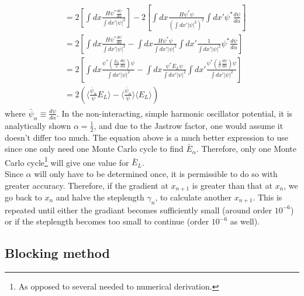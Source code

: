 \documentclass[english, a4paper]{article}
\begin{document}
\begin{align}
\begin{split}
&= 2\left[ \int dx\frac{H\psi^*\frac{d\psi}{d\alpha}}{\int dx'|\psi|^2} \right] - 2\left[ \int dx \frac{H\psi^*\psi}{\left(\int dx'|\psi|^2\right)^2}\int dx' \psi^*\frac{d\psi}{d\alpha} \right]\\
&= 2\left[ \int dx\frac{H\psi^*\frac{d\psi}{d\alpha}}{\int dx'|\psi|^2} - \int dx \frac{H\psi^*\psi}{\int dx'|\psi|^2}\int dx' \frac{1}{\int dx'|\psi|^2}\psi^*\frac{d\psi}{d\alpha} \right]\\
&= 2\left[ \int dx\frac{\psi^*\left(\frac{E_L}{\psi}\frac{d\psi}{d\alpha}\right) \psi}{\int dx'|\psi|^2} - \int dx \frac{\psi^* E_L\psi}{\int dx'|\psi|^2}\int dx' \frac{\psi^*\left(\frac{1}{\psi}\frac{d\psi}{d\alpha}\right)\psi}{\int dx'|\psi|^2} \right]\\
&= 2\left( \langle\frac{\bar{\psi}_\alpha}{\psi}E_L\rangle -  \langle\frac{\bar{\psi}_\alpha}{\psi}\rangle\langle E_L\rangle \right)
\end{split}
\end{align}
where $\bar{\psi}_\alpha \equiv \frac{d\psi}{d\alpha}$. In the non-interacting, simple harmonic oscillator potential, it is analytically shown $\alpha = \frac{1}{2}$, and due to the Jastrow factor, one would assume it doesn't differ too much.
The equation above is a much better expression to use since one only need one Monte Carlo cycle to find $\bar{E}_\alpha$. Therefore, only one Monte Carlo cycle\footnote{As opposed to several needed to numerical derivation.} will give one value for $\bar{E}_L$.\\
Since $\alpha$ will only have to be determined once, it is permissible to do so with greater accuracy. Therefore, if the gradient at $x_{n+1}$ is greater than that at $x_n$, we go back to $x_n$ and halve the steplength $\gamma_n$, to calculate another $x_{n+1}$.
This is repeated until either the gradiant becomes sufficiently small (around order $10^{-6}$) or if the steplength becomes too small to continue (order $10^{-6}$ as well).

\subsection{Blocking method}
\end{document}
